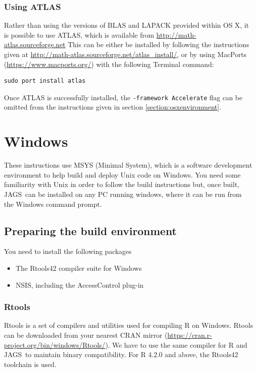 \documentclass[11pt, a4paper, titlepage]{article}
\newcommand{\JAGS}{\textsf{JAGS}}
\begin{document}
\subsubsection{Using ATLAS}

Rather than using the versions of BLAS and LAPACK provided within OS X, it
is possible to use ATLAS, which is available from \url{http://math-atlas.sourceforge.net}
This can be either be installed by following the instructions given at
\url{http://math-atlas.sourceforge.net/atlas_install/}, or by using MacPorts 
(\url{https://www.macports.org/}) with the following Terminal command:

\begin{verbatim}
sudo port install atlas
\end{verbatim}

Once ATLAS is successfully installed, the \texttt{-framework Accelerate} flag can
be omitted from the instructions given in section \ref{section:osxenvironment}.



\clearpage
\section{Windows}
\label{section:windows}

These instructions use MSYS (Minimal System), which is a software
development environment to help build and deploy Unix code on Windows.
You need some familiarity with Unix in order to follow the build
instructions but, once built, \JAGS\ can be installed on any PC
running windows, where it can be run from the Windows command prompt.

\subsection{Preparing the build environment}

You need to install the following packages
\begin{itemize}
\item The Rtools42 compiler suite for Windows
\item NSIS, including the AccessControl plug-in  
\end{itemize}

\subsubsection{Rtools}

Rtools is a set of compilers and utilities used for compiling R on
Windows. Rtools can be downloaded from your nearest CRAN mirror
(\url{https://cran.r-project.org/bin/windows/Rtools/}). We have to use
the same compiler for R and \JAGS\ to maintain binary compatibility.
For R 4.2.0 and above, the Rtools42 toolchain is used.
\end{document}
